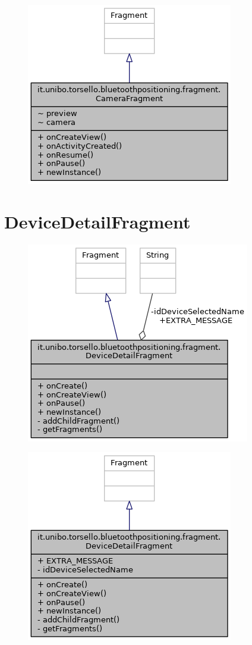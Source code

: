 \begin{figure}[ph]
	\centering
	\includegraphics[width=0.5\linewidth]{img/uml/class/classit_1_1unibo_1_1torsello_1_1bluetoothpositioning_1_1fragment_1_1CameraFragment__inherit__graph.png}
	\caption{}
\end{figure}

\newpage
\section{DeviceDetailFragment}
\begin{figure}[ph]
	\centering
	\includegraphics[width=0.7\linewidth]{img/uml/class/classit_1_1unibo_1_1torsello_1_1bluetoothpositioning_1_1fragment_1_1DeviceDetailFragment__coll__graph.png}
	\caption{}
\end{figure}

\begin{figure}[ph]
	\centering
	\includegraphics[width=0.5\linewidth]{img/uml/class/classit_1_1unibo_1_1torsello_1_1bluetoothpositioning_1_1fragment_1_1DeviceDetailFragment__inherit__graph.png}
	\caption{}
\end{figure}

